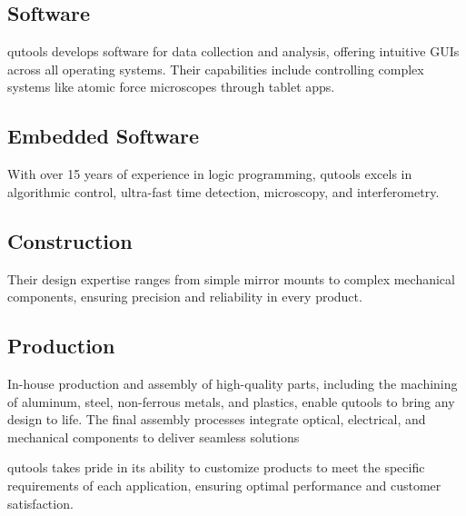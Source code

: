 \subsection{Software}
qutools develops software for data collection and analysis, offering intuitive GUIs across all operating systems. Their capabilities include controlling complex systems like atomic force microscopes through tablet apps.

\subsection{Embedded Software}
With over 15 years of experience in logic programming, qutools excels in algorithmic control, ultra-fast time detection, microscopy, and interferometry.

\subsection{Construction}
Their design expertise ranges from simple mirror mounts to complex mechanical components, ensuring precision and reliability in every product.

\subsection{Production}
In-house production and assembly of high-quality parts, including the machining of aluminum, steel, non-ferrous metals, and plastics, enable qutools to bring any design to life. The final assembly processes integrate optical, electrical, and mechanical components to deliver seamless solutions

qutools takes pride in its ability to customize products to meet the specific requirements of each application, ensuring optimal performance and customer satisfaction.
